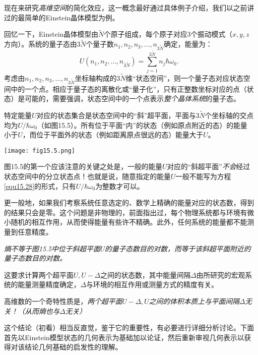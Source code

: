 现在来研究{\it 高维空间}的简化效应，这一概念最好通过具体例子介绍，我们以之前讲过的最简单的Einstein晶体模型为例。

回忆一下，Einstein晶体模型由$\tilde{N}$个原子组成，每个原子对应3个振动模式（$x, y, z$方向）。系统的量子态由$3 \tilde{N}$个量子数$n_1, n_2, n_3, \dots, n_{3 \tilde{N}}$确定，能量为：
\begin{equation}
	U(n_1, n_2, \dots, n_{3 \tilde{N}}) = \sum_{j = 1}^{3 \tilde{N}} n_j \hbar \omega_0.
\label{equ15.28}
\end{equation}
考虑由$n_1, n_2, n_3, \dots, n_{3 \tilde{N}}$坐标轴构成的$3 \tilde{N}$维“状态空间”，则一个量子态对应状态空间中的一个点。相应于量子态的离散化或“量子化”，只有正整数坐标对应的点（状态）是可能的，需要强调，状态空间中的一个点表示{\it 整个晶体系统}的量子态。

特定能量$U$对应的状态集合是状态空间中的“斜”超平面，平面与$3 \tilde{N}$个坐标轴的交点均为$U/\hbar \omega_0$（如图15.5）。所有位于平面“内”的状态（例如原点附近的态）的能量小于$U$，而位于平面外的状态（例如距离原点很远的态）能量大于$U$。

{
	\centering
	\texttt{[image: fig15.5.png]}
	\label{fig15.5}
}

图15.5的第一个应该注意的关键之处是，一般的能量$U$对应的“斜超平面”{\it 不会}经过状态空间中的分立状态点！也就是说，随意指定的能量$U$一般不能写为方程\eqref{equ15.28}的形式，只有$U/\hbar \omega_0$为整数才可以。

更一般地，如果我们考察系统任意选定的、数学上精确的能量对应的状态数，得到的结果只会是零。这个问题是非物理的，前面指出过，每个物理系统都与环境有微小随机的相互作用，从而使得能量有些许不精确。此外，任何系统的能量都不能测量到任意精度。

{\it 熵不等于图15.5中位于斜超平面$U$的量子态数目的对数，而等于该斜超平面附近的量子态数目的对数。}

这要求计算两个超平面$U, U - \Delta$之间的状态数，其中能量间隔$\Delta$由所研究的宏观系统的能量测量精度确定，$\Delta$与环境的相互作用或测量方式的精度有关。

高维数的一个奇特性质是，{\it 两个超平面$U-\Delta, U$之间的体积本质上与平面间隔$\Delta$无关！（从而熵也与$\Delta$无关）}

这个结论（初看）相当反直觉，鉴于它的重要性，有必要进行详细分析讨论。下面首先以Einstein模型状态的几何表示为基础加以论证，然后重新审视几何表示以获得对该结论几何基础的启发性的理解。

